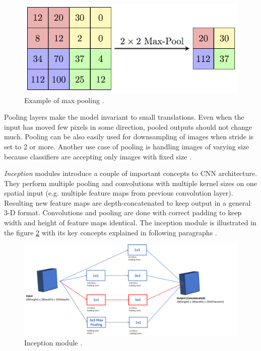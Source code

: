 \begin{figure}[ht]\centering
    \centering
    \includegraphics[]{figures/todo-maxpool.png}
    \caption{Example of max pooling .}
    \label{fig:pooling}
\end{figure}

Pooling layers make the model invariant to small translations. Even when the input has moved few pixels in some direction, pooled outputs should not change much. Pooling can be also easily used for downsampling of images when stride is set to 2 or more. Another use case of pooling is handling images of varying size because classifiers are accepting only images with fixed size \cite{Goodfellow-et-al-2016}.

\textit{Inception} modules introduce a couple of important concepts to CNN architecture. They perform multiple pooling and convolutions with multiple kernel sizes on one spatial input (e.g. multiple feature maps from previous convolution layer). Resulting new feature maps are depth-concatenated to keep output in a general 3-D format. Convolutions and pooling are done with correct padding to keep width and height of feature maps identical. The inception module is illustrated in the figure \ref{fig:inception} with its key concepts explained in following paragraphs \cite{szegedy2014going}.

\begin{figure}[ht]\centering
    \centering
    \includegraphics[scale=0.3]{figures/todo-inception.png}
    \caption{Inception module .}
    \label{fig:inception}
\end{figure}

